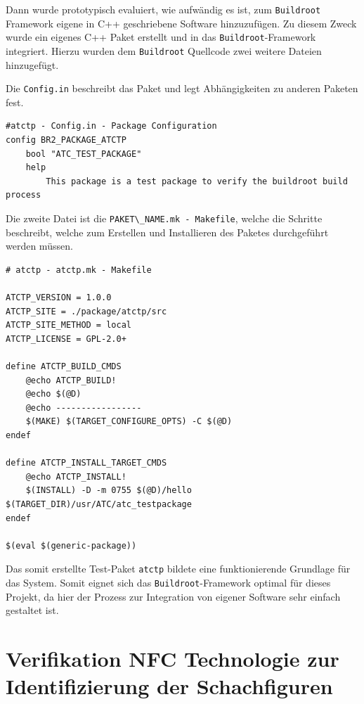 Dann wurde prototypisch evaluiert, wie aufwändig es ist, zum
\passthrough{\lstinline!Buildroot!} Framework eigene in C++ geschriebene
Software hinzuzufügen. Zu diesem Zweck wurde ein eigenes C++ Paket
erstellt und in das \passthrough{\lstinline!Buildroot!}-Framework
integriert. Hierzu wurden dem \passthrough{\lstinline!Buildroot!}
Quellcode zwei weitere Dateien hinzugefügt.

Die \passthrough{\lstinline!Config.in!} beschreibt das Paket und legt
Abhängigkeiten zu anderen Paketen fest.

\begin{lstlisting}
#atctp - Config.in - Package Configuration
config BR2_PACKAGE_ATCTP
    bool "ATC_TEST_PACKAGE"
    help
        This package is a test package to verify the buildroot build process
\end{lstlisting}

Die zweite Datei ist die
\passthrough{\lstinline!PAKET\_NAME.mk - Makefile!}, welche die Schritte
beschreibt, welche zum Erstellen und Installieren des Paketes
durchgeführt werden müssen.

\begin{lstlisting}
# atctp - atctp.mk - Makefile

ATCTP_VERSION = 1.0.0
ATCTP_SITE = ./package/atctp/src
ATCTP_SITE_METHOD = local
ATCTP_LICENSE = GPL-2.0+

define ATCTP_BUILD_CMDS
    @echo ATCTP_BUILD!
    @echo $(@D)
    @echo -----------------
    $(MAKE) $(TARGET_CONFIGURE_OPTS) -C $(@D)
endef

define ATCTP_INSTALL_TARGET_CMDS
    @echo ATCTP_INSTALL!
    $(INSTALL) -D -m 0755 $(@D)/hello $(TARGET_DIR)/usr/ATC/atc_testpackage
endef

$(eval $(generic-package))
\end{lstlisting}

Das somit erstellte Test-Paket \passthrough{\lstinline!atctp!} bildete
eine funktionierende Grundlage für das System. Somit eignet sich das
\passthrough{\lstinline!Buildroot!}-Framework optimal für dieses
Projekt, da hier der Prozess zur Integration von eigener Software sehr
einfach gestaltet ist.

\hypertarget{verifikation-nfc-technologie-zur-identifizierung-der-schachfiguren}{%
\section{Verifikation NFC Technologie zur Identifizierung der
Schachfiguren}\label{verifikation-nfc-technologie-zur-identifizierung-der-schachfiguren}}

